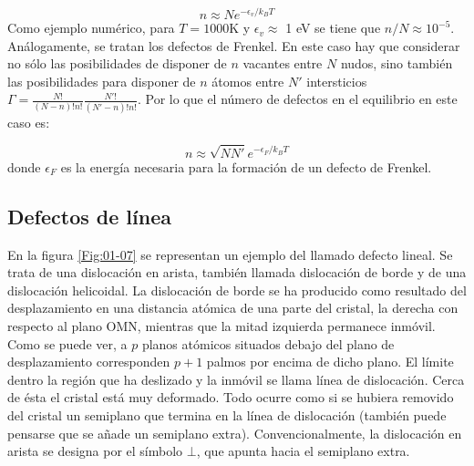 \begin{equation}
    n \approx N e^{-\epsilon_v /k_B T}
\end{equation}
Como ejemplo numérico, para $T=1000$K y $\epsilon_v  \approx $ 1 eV se tiene que $n/N \approx 10^{-5}$. Análogamente, se tratan los defectos de Frenkel. En este caso hay que considerar no sólo las posibilidades de disponer de $n$ vacantes entre $N$ nudos, sino también las posibilidades para disponer de $n$ átomos entre $N'$ intersticios $\Gamma = \frac{N!}{(N-n)! n!}\frac{N'!}{(N'-n)! n!}$. Por lo que el número de defectos en el equilibrio en este caso es:

\begin{equation}
    n \approx \sqrt{NN'} e^{-\epsilon_F / k_B T}
\end{equation}
donde $\epsilon_F$ es la energía necesaria para la formación de un defecto de Frenkel.

\subsection{Defectos de línea}

En la figura \ref{Fig:01-07} se representan un ejemplo del llamado defecto lineal. Se trata de una dislocación en arista, también llamada dislocación de borde y de una dislocación helicoidal. La dislocación de borde se ha producido como resultado del desplazamiento en una distancia atómica de una parte del cristal, la derecha con respecto al plano OMN, mientras que la mitad izquierda permanece inmóvil. Como se puede ver, a $p$ planos atómicos situados debajo del plano de desplazamiento corresponden $p+1$ palmos por encima de dicho plano. El límite dentro la región que ha deslizado y la inmóvil se llama línea de dislocación. Cerca de ésta el cristal está muy deformado. Todo ocurre como si se hubiera removido del cristal un semiplano que termina en la línea de dislocación (también puede pensarse que se añade un semiplano extra). Convencionalmente, la dislocación en arista se designa por el símbolo $\bot$, que apunta hacia el semiplano extra. 


